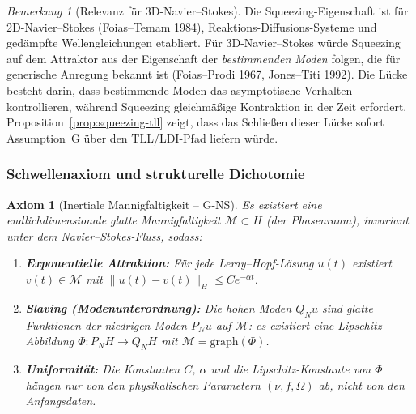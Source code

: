 \documentclass[12pt,a4paper]{article}
\theoremstyle{definition}
\theoremstyle{plain}
\newtheorem{axiom}[definition]{Axiom}
\theoremstyle{remark}
\newtheorem{remark}[definition]{Bemerkung}
\begin{document}
\begin{remark}[Relevanz f\"ur 3D-Navier--Stokes]\label{rem:squeezing-ns}
Die Squeezing-Eigenschaft ist f\"ur 2D-Navier--Stokes (Foias--Temam 1984), Reaktions-Diffusions-Systeme und ged\"ampfte Wellengleichungen etabliert. F\"ur 3D-Navier--Stokes w\"urde Squeezing auf dem Attraktor aus der Eigenschaft der \emph{bestimmenden Moden} folgen, die f\"ur generische Anregung bekannt ist (Foias--Prodi 1967, Jones--Titi 1992). Die L\"ucke besteht darin, dass bestimmende Moden das asymptotische Verhalten kontrollieren, w\"ahrend Squeezing gleichm\"a\ss ige Kontraktion in der Zeit erfordert. Proposition~\ref{prop:squeezing-tll} zeigt, dass das Schlie\ss en dieser L\"ucke sofort Assumption~G \"uber den TLL/LDI-Pfad liefern w\"urde.
\end{remark}

\subsubsection*{Schwellenaxiom und strukturelle Dichotomie}

\begin{axiom}[Inertiale Mannigfaltigkeit -- G-NS]\label{ax:g-ns}
Es existiert eine endlichdimensionale glatte Mannigfaltigkeit $\mathcal{M} \subset H$ (der Phasenraum), invariant unter dem Navier--Stokes-Fluss, sodass:
\begin{enumerate}
\item[(G1)] \textbf{Exponentielle Attraktion:} F\"ur jede Leray--Hopf-L\"osung $u(t)$ existiert $v(t) \in \mathcal{M}$ mit $\|u(t) - v(t)\|_H \leq C e^{-\alpha t}$.
\item[(G2)] \textbf{Slaving (Modenunterordnung):} Die hohen Moden $Q_N u$ sind glatte Funktionen der niedrigen Moden $P_N u$ auf $\mathcal{M}$: es existiert eine Lipschitz-Abbildung $\Phi: P_N H \to Q_N H$ mit $\mathcal{M} = \mathrm{graph}(\Phi)$.
\item[(G3)] \textbf{Uniformit\"at:} Die Konstanten $C$, $\alpha$ und die Lipschitz-Konstante von $\Phi$ h\"angen nur von den physikalischen Parametern $(\nu, f, \Omega)$ ab, nicht von den Anfangsdaten.
\end{enumerate}
\end{axiom}
\end{document}
